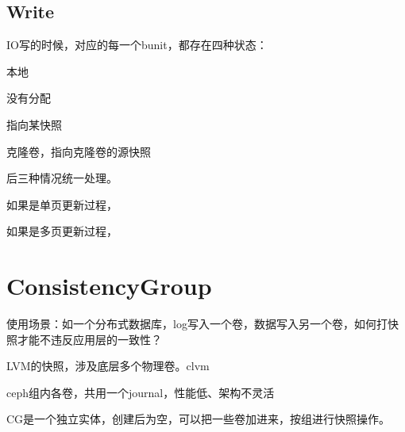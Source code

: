 \subsection{Write}

IO写的时候，对应的每一个bunit，都存在四种状态：
\begin{enumbox}
\item 本地
\item 没有分配
\item 指向某快照
\item 克隆卷，指向克隆卷的源快照
\end{enumbox}

后三种情况统一处理。

如果是单页更新过程，

如果是多页更新过程，

\section{ConsistencyGroup}

使用场景：如一个分布式数据库，log写入一个卷，数据写入另一个卷，如何打快照才能不违反应用层的一致性？

LVM的快照，涉及底层多个物理卷。clvm

ceph组内各卷，共用一个journal，性能低、架构不灵活

CG是一个独立实体，创建后为空，可以把一些卷加进来，按组进行快照操作。
